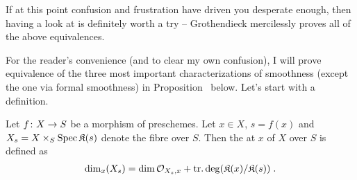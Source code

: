 \documentclass[a4paper,parskip=half,numbers=enddot, DIV=12]{scrreprt}
\begin{document}
If at this point confusion and frustration have driven you desperate enough, then having a look at \cite[Ch.\:IV \S17]{egaIV4} is definitely worth a try -- Grothendieck mercilessly proves all of the above equivalences.

For the reader's convenience (and to clear my own confusion), I will prove equivalence of the three most important characterizations of smoothness (except the one via formal smoothness) in Proposition~ below. Let's start with a definition.
\begin{defi}
	Let $f\colon X\morphism S$ be a morphism of preschemes. Let $x\in X$, $s=f(x)$ and $X_s=X\times_S\operatorname{Spec} \mathfrak{K}(s)$ denote the fibre over $S$. Then the  at $x$ of $X$ over $S$ is defined as
	\begin{align*}
		\dim_x(X_s)=\dim\mathcal{O}_{X_s,x}+\operatorname{tr.deg}(\mathfrak{K}(x)/\mathfrak{K}(s))\;.
	\end{align*} 
\end{defi}
\end{document}
